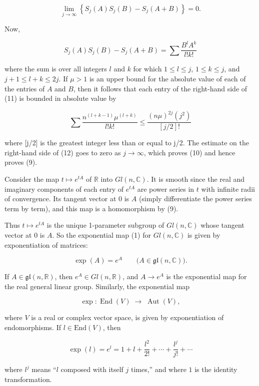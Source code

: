 \begin{examples}
\begin{equation}
\tag{10}\label{eq:3.35:10}
\lim_{j\to\infty}\left\{S_{j}(A)S_{j}(B)-S_{j}(A+B)\right\}=0.
\end{equation}

Now,

\begin{equation}
\tag{11}\label{eq:3.35:11}
S_{j}(A)S_{j}(B)-S_{j}(A+B)=\sum\frac{B^{l}A^{k}}{l!k!}
\end{equation}

where the sum is over all integers $l$ and $k$ for which $1 \leq l \leq j$, $1 \leq k \leq j$, and $j + 1 \leq l + k \leq 2j$. If $\mu > 1$ is an upper bound for the absolute value of each of the entries of $A$ and $B$, then it follows that each entry of the right-hand side of (11) is bounded in absolute value by

\begin{equation}
\tag{12}\label{eq:3.35:12}
\sum\frac{n^{(l+k-1)}\mu^{(l+k)}}{l!k!}\leq\frac{(n\mu)^{2j}(j^{2})}{[j/2]!}
\end{equation}

where [j/2] is the greatest integer less than or equal to j/2. The estimate on the right-hand side of (12) goes to zero as $j \to \infty$, which proves (10) and hence proves (9).

Consider the map $t \mapsto e^{tA}$ of $\mathbb{R}$ into $Gl(n,\mathbb{C})$. It is smooth since the real and imaginary components of each entry of $e^{tA}$ are power series in $t$ with infinite radii of convergence. Its tangent vector at $0$ is $A$ (simply differentiate the power series term by term), and this map is a homomorphism by (9).

Thus $t \mapsto e^{tA}$ is the unique 1-parameter subgroup of $Gl(n,\mathbb{C})$ whose tangent vector at 0 is $A$. So the exponential map (1) for $Gl(n,\mathbb{C})$ is given by exponentiation of matrices:

\begin{equation}
\tag{13}\label{eq:3.35:13}
\exp(A)=e^{A}\qquad\big(A\in\mathfrak{gl}(n,\mathbb{C})\big).
\end{equation}

If $A \in \mathfrak{gl}(n, \mathbb{R})$, then $e^A \in Gl(n, \mathbb{R})$, and $A \to e^A$ is the exponential map for the real general linear group. Similarly, the exponential map

\begin{equation}
\tag{14}\label{eq:3.35:14}
\exp\colon\operatorname{End}(V)\;\to\;\operatorname{Aut}(V),
\end{equation}

where $V$ is a real or complex vector space, is given by exponentiation of endomorphisms. If $l \in \mathrm{End}(V)$, then

\begin{equation}
\tag{15}\label{eq:3.35:15}
\exp(l)=e^{l}=1+l+\frac{l^{2}}{2!}+\cdots+\frac{l^{j}}{j!}+\cdots
\end{equation}

where $l^{j}$ means “$l$ composed with itself $j$ times,” and where $1$ is the identity transformation.

\end{examples}

